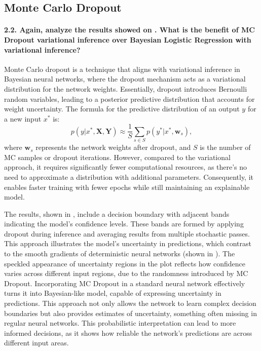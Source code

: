 \subsection{Monte Carlo Dropout}
\paragraph{2.2. Again, analyze the results showed on . What is the benefit of MC Dropout variational inference over Bayesian Logistic Regression with variational inference?}

Monte Carlo dropout is a technique that aligns with variational inference in Bayesian neural networks, where the dropout mechanism acts as a variational distribution for the network weights. Essentially, dropout introduces Bernoulli random variables, leading to a posterior predictive distribution that accounts for weight uncertainty. The formula for the predictive distribution of an output $ y $ for a new input $ x^* $ is: \[ p(y | x^*, \mathbf{X}, \mathbf{Y}) \approx \frac{1}{S} \sum_{s \in S} p(y^* | x^*, \mathbf{w}_s), \] where $ \mathbf{w}_s $ represents the network weights after dropout, and $ S $ is the number of MC samples or dropout iterations. However, compared to the variational approach, it requires significantly fewer computational resources, as there's no need to approximate a distribution with additional parameters. Consequently, it enables faster training with fewer epochs while still maintaining an explainable model.

The results, shown in , include a decision boundary with adjacent bands indicating the model's confidence levels. These bands are formed by applying dropout during inference and averaging results from multiple stochastic passes. This approach illustrates the model's uncertainty in predictions, which contrast to the smooth gradients of deterministic neural networks (shown in ). The speckled appearance of uncertainty regions in the plot reflects how confidence varies across different input regions, due to the randomness introduced by MC Dropout. Incorporating MC Dropout in a standard neural network effectively turns it into Bayesian-like model, capable of expressing uncertainty in predictions. This approach not only allows the network to learn complex decision boundaries but also provides estimates of uncertainty, something often missing in regular neural networks. This probabilistic interpretation can lead to more informed decisions, as it shows how reliable the network's predictions are across different input areas. 

